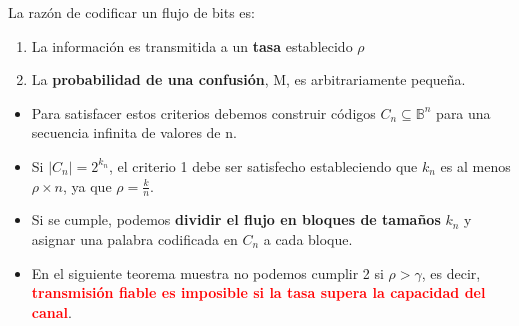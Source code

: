 \documentclass{beamer}
\theoremstyle{plain}
\theoremstyle{example}
\theoremstyle{example}
\begin{document}
\begin{frame}  \small  
La razón de codificar un flujo de bits es:

\begin{enumerate}
\item La información es transmitida a un \textbf{tasa} establecido $\rho$
\item La \textbf{probabilidad de una confusión}, M, es arbitrariamente pequeña.
\end{enumerate}

\begin{itemize} 
\item  Para satisfacer estos criterios debemos construir códigos $C_n \subseteq \mathbb{B}^n$ para una secuencia infinita de valores de n. 

\item Si $|C_n|= 2^{k_n}$, el criterio 1 debe ser satisfecho estableciendo que $k_n$ es al menos $\rho \times n$, ya que $\rho = \frac{k}{n}$.

\item Si se cumple, podemos \textbf{dividir el flujo en bloques de tamaños} $k_n$ y asignar una palabra codificada en $C_n$ a cada bloque. 

\item En el siguiente teorema muestra no podemos cumplir 2 si $\rho > \gamma$, es decir, \textcolor{red}{\textbf{transmisión fiable es imposible si la tasa supera la capacidad del canal}}.

\end{itemize} 


\end{frame} 
\end{document}
